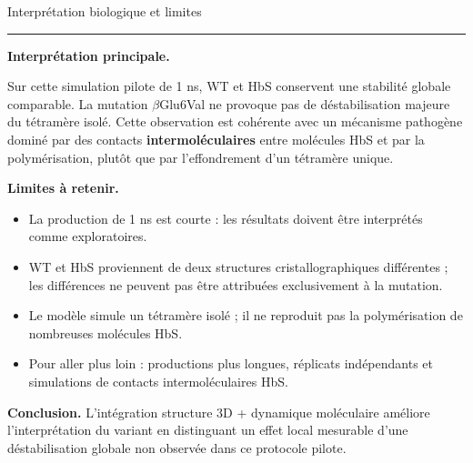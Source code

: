 \documentclass[aspectratio=169,10pt]{beamer}
\newcommand{\slidetitleline}{\par\vspace{-0.3em}\noindent\textcolor{UniBlue}{\rule{\linewidth}{0.7pt}}\par\vspace{0.25em}}
\begin{document}
\begin{frame}{Interprétation biologique et limites}
\slidetitleline
\small
\textbf{Interprétation principale.}\par
Sur cette simulation pilote de 1 ns, WT et HbS conservent une stabilité globale comparable. La mutation \(\beta\)Glu6Val ne provoque pas de déstabilisation majeure du tétramère isolé. Cette observation est cohérente avec un mécanisme pathogène dominé par des contacts \textbf{intermoléculaires} entre molécules HbS et par la polymérisation, plutôt que par l'effondrement d'un tétramère unique.

\vspace{0.6em}
\textbf{Limites à retenir.}\par
\footnotesize
\begin{itemize}
  \item La production de 1 ns est courte : les résultats doivent être interprétés comme exploratoires.
  \item WT et HbS proviennent de deux structures cristallographiques différentes ; les différences ne peuvent pas être attribuées exclusivement à la mutation.
  \item Le modèle simule un tétramère isolé ; il ne reproduit pas la polymérisation de nombreuses molécules HbS.
  \item Pour aller plus loin : productions plus longues, réplicats indépendants et simulations de contacts intermoléculaires HbS.
\end{itemize}

\vspace{0.4em}
\textbf{Conclusion.} L'intégration structure 3D + dynamique moléculaire améliore l'interprétation du variant en distinguant un effet local mesurable d'une déstabilisation globale non observée dans ce protocole pilote.
\end{frame}
\end{document}
